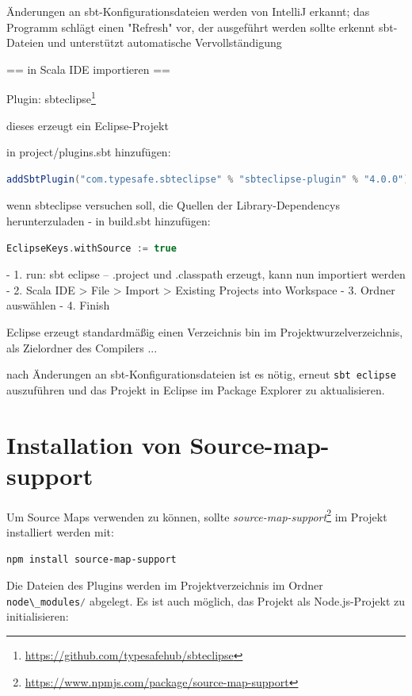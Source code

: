 \documentclass[a4paper, 12pt, hidelinks, listof=totoc, listoftables=totoc, bibliography=totoc]{scrreprt}
\newcommand{\code}[1]{\lstinline[language=Scala, style=inline]|#1|}
\begin{document}
Änderungen an sbt-Konfigurationsdateien werden von IntelliJ erkannt; das Programm schlägt einen "Refresh" vor, der ausgeführt werden sollte
erkennt sbt-Dateien und unterstützt automatische Vervollständigung


== in Scala IDE importieren ==

Plugin: sbteclipse\footnote{\url{https://github.com/typesafehub/sbteclipse}}

dieses erzeugt ein Eclipse-Projekt

in project/plugins.sbt hinzufügen:
\begin{lstlisting}[language=Scala, style=snippet]
addSbtPlugin("com.typesafe.sbteclipse" % "sbteclipse-plugin" % "4.0.0")
\end{lstlisting}

wenn sbteclipse versuchen soll, die Quellen der Library-Dependencys herunterzuladen - in build.sbt hinzufügen:

\begin{lstlisting}[language=Scala, style=snippet]
EclipseKeys.withSource := true
\end{lstlisting}



- 1. run:
  sbt eclipse  --  .project und .classpath erzeugt, kann nun importiert werden
- 2. Scala IDE > File > Import > Existing Projects into Workspace
- 3. Ordner auswählen
- 4. Finish


Eclipse erzeugt standardmäßig einen Verzeichnis bin im Projektwurzelverzeichnis, als Zielordner des Compilers ...

nach Änderungen an sbt-Konfigurationsdateien ist es nötig, erneut \code{sbt eclipse} auszuführen und das Projekt in Eclipse im Package Explorer zu aktualisieren.






\section{Installation von Source-map-support}

Um Source Maps verwenden zu können, sollte \emph{source-map-support}\footnote{\url{https://www.npmjs.com/package/source-map-support}} im Projekt installiert werden mit:

\begin{lstlisting}[style=snippet]
npm install source-map-support
\end{lstlisting}

Die Dateien des Plugins werden im Projektverzeichnis im Ordner \mbox{\code{node\_modules/}} abgelegt. Es ist auch möglich, das Projekt als Node.js-Projekt zu initialisieren:
\end{document}
